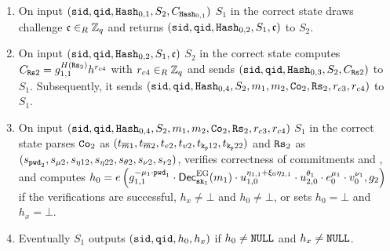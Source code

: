 \begin{enumerate}
	    \item On input $(\mathtt{sid},\mathtt{qid},\mathtt{Hash}_{0,1},S_2,C_{\mathtt{Hash}_{0,1}})$ $S_1$ in the correct state draws challenge $\mathfrak{c}\in_R\mathbb{Z}_q$ and returns $(\mathtt{sid},\mathtt{qid},\mathtt{Hash}_{0,2},S_1,\mathfrak{c})$ to $S_2$. 
	    
	    \item On input $(\mathtt{sid},\mathtt{qid},\mathtt{Hash}_{0,2},S_1,\mathfrak{c})$ $S_2$ in the correct state computes
	    $C_{\mathtt{Rs}2}=g_{1,1}^{H(\mathtt{Rs}_{2})} h^{r_{c4}}$ with $r_{c4}\in_R\mathbb{Z}_q$
	    and sends $(\mathtt{sid},\mathtt{qid},\mathtt{Hash}_{0,3},S_2,C_{\mathtt{Rs}2})$ to $S_1$.
	    Subsequently, it sends $(\mathtt{sid},\mathtt{qid},\mathtt{Hash}_{0,4},S_2, m_1, m_2, \mathtt{Co}_2, \mathtt{Rs}_2, r_{c3}, r_{c4})$ to $S_1$.
	    
	    \item On input $(\mathtt{sid},\mathtt{qid},\mathtt{Hash}_{0,4},S_2, m_1, m_2, \mathtt{Co}_2, \mathtt{Rs}_2, r_{c3}, r_{c4})$ $S_1$ in the correct state parses $\mathtt{Co}_{2}$ as $(t_{\overline{m}1}, t_{\overline{m}2}, t_{e2}, t_{v2}, t_{\mathtt{k_p}12}, t_{\mathtt{k_p}22})$ and $\mathtt{Rs}_{2}$ as $(s_{\mathtt{pwd}_2}, s_{\mu2}, s_{\eta12}, s_{\eta22}, s_{\theta2}, s_{\nu2}, s_{r2})$, verifies correctness of commitments and \ZKP , and computes
	      $h_0 = e\left( g_{1,1}^{-\mu_1\cdot \mathtt{pwd}_1} \cdot \mathsf{Dec}_{\mathtt{sk}_1}^\mathrm{EG}(m_1) \cdot u_{1,0}^{\eta_{1,1}+\xi_0\eta_{2,1}} \cdot u_{2,0}^{\theta_1} \cdot e_0^{\mu_1} \cdot v_0^{\nu_1}, g_2 \right)$ if the verifications are successful, $h_x\not=\bot$ and $h_0\not=\bot$, or sets $h_0=\bot$ and $h_x=\bot$.
	    
	    \item Eventually $S_1$ outputs $(\mathtt{sid}, \mathtt{qid}, h_0, h_x)$ if $h_0\not=\mathtt{NULL}$ and $h_x\not=\mathtt{NULL}$.
	  \end{enumerate}
	  	

